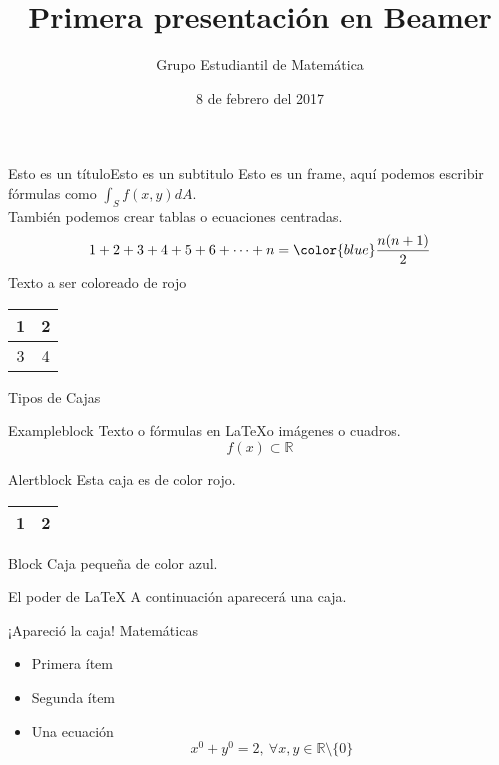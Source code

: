 \documentclass[handout]{beamer}
\author{Grupo Estudiantil de Matemática}
\title{Primera presentación en Beamer}
\institute{\LARGE{Universidad Nacional de Ingeniería\\Facultad de Ciencias}}
\date{8 de febrero del 2017} %
\newcommand{\ds}{\displaystyle}
\newcommand{\re}{\mathbb{R}}
\begin{document}
	\begin{frame}
		\maketitle
	\end{frame}

	\begin{frame}{Esto es un título}{Esto es un subtitulo}
	Esto es un frame, aquí podemos escribir fórmulas como \(\ds\int_S f(x,y)dA \).\\
	También podemos crear tablas o ecuaciones centradas.
	\[1+2+3+4+5+6+\cdots+n = {\color{blue}\frac{n(n+1)}{2}}\]
	{\color{red} Texto a ser coloreado de rojo} 
	\begin{center}
		
		\begin{tabular}{||c||c||}
			\hline 1 & 2 \\ \hline
			\hline 3 & 4 \\ \hline
			\hline 
		\end{tabular}
		
	\end{center}
	
\end{frame}

\begin{frame}{Tipos de Cajas}
	
	\begin{exampleblock}{Exampleblock}
	Texto o fórmulas en \LaTeX o imágenes o cuadros.
	\[f(x)\subset \re\]
\end{exampleblock}
	
\begin{alertblock}{Alertblock}
	Esta caja es de color rojo.
	
	\begin{center}
		\begin{tabular}{||c||c||}
			\hline 1 & 2 \\ \hline						
		\end{tabular} 
	\end{center}
	
\end{alertblock}

\begin{block}{Block}
	Caja pequeña de color azul.
\end{block}	
\end{frame}
	\begin{frame}{El poder de \LaTeX}
	A continuación aparecerá una caja. \pause 
	\begin{alertblock}{¡Apareció la caja!}
		Matemáticas
		\begin{itemize}
			\item Primera ítem \pause
			\item Segunda ítem  \pause
			\item Una ecuación \pause \[x^0+y^0=2,~\forall x,y\in\re\setminus\{0\}\]
		\end{itemize}
		
	\end{alertblock}
	
\end{frame}
\end{document}
